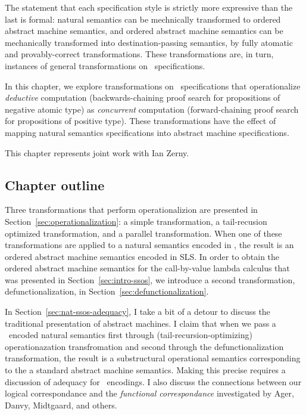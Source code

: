 \noindent
The statement that each specification style is strictly more
expressive than the last is formal: natural semantics can be
mechnically transformed to ordered abstract machine semantics, and
ordered abstract machine semantics can be mechanically transformed
into destination-passing semantics, by fully atomatic and
provably-correct transformations. These transformations are, in turn,
instances of general transformations on \sls~specifications. 

In this chapter, we explore transformations on \sls~specifications
that operationalize {\it deductive} computation (backwards-chaining
proof search for propositions of negative atomic type) as {\it
  concurrent} computation (forward-chaining proof search for
propositions of positive type). These transformations have the effect
of mapping natural semantics specifications into abstract machine
specifications.

This chapter represents joint work with Ian Zerny.

\subsection*{Chapter outline}

Three transformations that perform operationalizion are presented in
Section~\ref{sec:operationalization}: a simple transformation, a
tail-recusion optimized transformation, and a parallel
transformation. When one of these transformations are applied to a
natural semantics encoded in \sls, the result is an ordered abstract
machine semantics encoded in SLS. In order to obtain the ordered
abstract machine semantics for the call-by-value lambda calculus that
was presented in Section~\ref{sec:intro-ssos}, we introduce a second
transformation, defunctionalization, in
Section~\ref{sec:defunctionalization}.

In Section~\ref{sec:nat-ssos-adequacy}, I take a bit of a detour to
discuss the traditional presentation of abstract machines. I claim
that when we pass a \sls~encoded natural semantics first through
(tail-recursion-optimizing) operationazation transfromation and second
through the defunctionalization transformation, the result is a
substructural operational semantics corresponding to the a standard
abstract machine semantics. Making this precise requires a discussion
of adequacy for \sls~encodings. I also discuss the connections between
our logical correspondance and the {\it functional correspondance}
investigated by Ager, Danvy, Midtgaard, and others.

